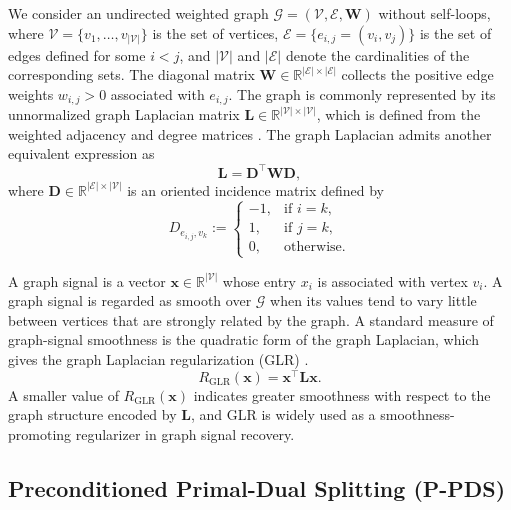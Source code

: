 We consider an undirected weighted graph $\mathcal{G}=(\mathcal{V},\mathcal{E},\mathbf{W})$ without self-loops, where $\mathcal{V}=\{v_1,\ldots,v_{|\mathcal{V}|}\}$ is the set of vertices, $\mathcal{E}=\{e_{i,j}=(v_i,v_j)\}$ is the set of edges defined for some $i<j$, and $|\mathcal{V}|$ and $|\mathcal{E}|$ denote the cardinalities of the corresponding sets.
The diagonal matrix $\mathbf{W}\in\mathbb{R}^{|\mathcal{E}|\times|\mathcal{E}|}$ collects the positive edge weights $w_{i,j}>0$ associated with $e_{i,j}$.
The graph is commonly represented by its unnormalized graph Laplacian matrix $\mathbf{L}\in\mathbb{R}^{|\mathcal{V}|\times|\mathcal{V}|}$, which is defined from the weighted adjacency and degree matrices \cite{merris1994laplacian}.
The graph Laplacian admits another equivalent expression as
\begin{equation}
\mathbf{L}
=
\mathbf{D}^{\top}\mathbf{W}\mathbf{D},
\label{eq:laplacian}
\end{equation}
where $\mathbf{D}\in\mathbb{R}^{|\mathcal{E}|\times|\mathcal{V}|}$ is an oriented incidence matrix defined by
\begin{equation}
D_{e_{i,j},v_k}
:=
\begin{cases}
-1, & \text{if } i=k,\\
1, & \text{if } j=k,\\
0, & \text{otherwise}.
\end{cases}
\label{eq:incidence}
\end{equation}

A graph signal is a vector $\mathbf{x}\in\mathbb{R}^{|\mathcal{V}|}$ whose entry $x_i$ is associated with vertex $v_i$.
A graph signal is regarded as smooth over $\mathcal{G}$ when its values tend to vary little between vertices that are strongly related by the graph.
A standard measure of graph-signal smoothness is the quadratic form of the graph Laplacian, which gives the graph Laplacian regularization (GLR) \cite{merris1994laplacian,ando2006learning}.
\begin{equation}
R_{\mathrm{GLR}}(\mathbf{x})
=
\mathbf{x}^{\top}\mathbf{L}\mathbf{x}.
\label{eq:glr}
\end{equation}
A smaller value of $R_{\mathrm{GLR}}(\mathbf{x})$ indicates greater smoothness with respect to the graph structure encoded by $\mathbf{L}$, and GLR is widely used as a smoothness-promoting regularizer in graph signal recovery.


\subsection{Preconditioned Primal-Dual Splitting (P-PDS)}

